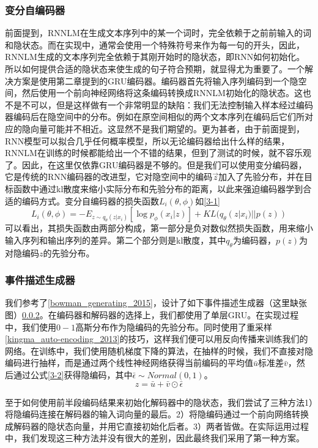 \documentclass[]{template}
\begin{document}
\subsubsection{变分自编码器}
前面提到，RNNLM在生成文本序列中的某一个词时，完全依赖于之前前输入的词和隐状态。而在实现中，通常会使用一个特殊符号来作为每一句的开头，因此，RNNLM生成的文本序列完全依赖于其刚开始时的隐状态，即RNN如何初始化。所以如何提供合适的隐状态来使生成的句子符合预期，就显得尤为重要了。一个解决方案是使用第二章提到的GRU编码器。编码器首先将输入序列编码到一个隐空间，然后使用一个前向神经网络将这条编码转换成RNNLM初始化的隐状态。这也不是不可以，但是这样做有一个非常明显的缺陷：我们无法控制输入样本经过编码器编码后在隐空间中的分布。例如在原空间相似的两个文本序列在编码后它们所对应的隐向量可能并不相近。这显然不是我们期望的。更为甚者，由于前面提到，RNN模型可以拟合几乎任何概率模型，所以无论编码器给出什么样的结果，RNNLM在训练的时候都能给出一个不错的结果，但到了测试的时候，就不容乐观了。因此，在这里仅依靠GRU编码器是不够的。但是我们可以使用变分编码器，它是传统的RNN编码器的改进型，它对隐空间中的编码\(\overrightarrow{z}\)加入了先验分布，并在目标函数中通过kl散度来缩小实际分布和先验分布的距离，以此来强迫编码器学到合适的编码方式。变分自编码器的损失函数$L_i(\theta,\phi)$如\ref{3-1}
\begin{equation}\label{3-1}
    L_i(\theta,\phi)=-E_{z\sim q_\theta(z|x_i)}[\log p_\phi(x_i|z)]+KL (q_\theta(z|x_i)||p(z))
\end{equation}
可以看出，其损失函数由两部分构成，第一部分是负对数似然损失函数，用来缩小输入序列和输出序列的差异。第二个部分则是kl散度，其中$q_\theta$为编码器，$p(z)$为对隐编码$z$的先验分布。

\subsubsection{事件描述生成器}
我们参考了\ref{bowman_generating_2015}，设计了如下事件描述生成器（这里缺张图）\ref{}。在编码器和解码器的选择上，我们都使用了单层GRU。在实现过程中，我们使用$0-1$高斯分布作为隐编码的先验分布。同时使用了重采样\ref{kingma_auto-encoding_2013}的技巧，这样我们便可以用反向传播来训练我们的网络。在训练中，我们使用随机梯度下降的算法，在抽样的时候，我们不直接对隐编码进行抽样，而是通过两个线性神经网络获得当前编码的平均值$\bar{u}$标准差$\bar{v}$，然后通过公式\ref{3-2}获得隐编码，其中$\bar\epsilon \sim Normal(0,1)$。
\begin{equation}\label{3-2}
    z=\bar{u}+\bar{v}\odot \bar\epsilon
\end{equation}

至于如何使用前半段编码结果来初始化解码器中的隐状态，我们尝试了三种方法1）将隐编码连接在解码器的输入词向量的最后。2）将隐编码通过一个前向网络转换成解码器的隐状态向量，并用它直接初始化后者。3）两者皆做。在实际运用过程中，我们发现这三种方法并没有很大的差别，因此最终我们采用了第一种方案。
\end{document}
